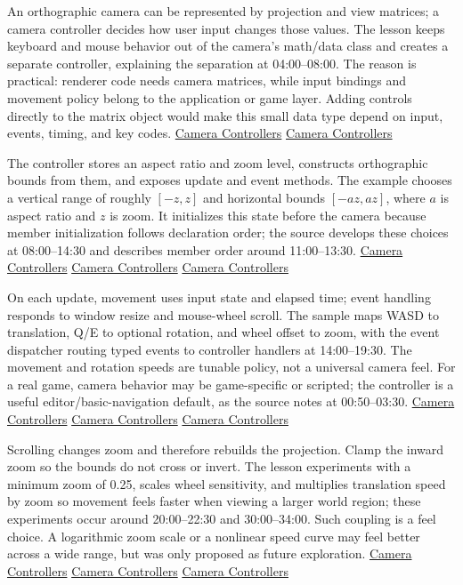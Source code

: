 \hypertarget{06-engine-ii-ch026-keep-camera-data-separate-from-camera-behavior}{}

An orthographic camera can be represented by projection and view matrices; a camera controller decides how user input changes those values. The lesson keeps keyboard and mouse behavior out of the camera's math/data class and creates a separate controller, explaining the separation at 04:00--08:00. The reason is practical: renderer code needs camera matrices, while input bindings and movement policy belong to the application or game layer. Adding controls directly to the matrix object would make this small data type depend on input, events, timing, and key codes. \href{https://www.youtube.com/watch?v=q7rwMoZQSmw&t=240s}{Camera Controllers} \href{https://www.youtube.com/watch?v=q7rwMoZQSmw&t=420s}{Camera Controllers}

The controller stores an aspect ratio and zoom level, constructs orthographic bounds from them, and exposes update and event methods. The example chooses a vertical range of roughly \([-z,z]\) and horizontal bounds \([-az,az]\), where \(a\) is aspect ratio and \(z\) is zoom. It initializes this state before the camera because member initialization follows declaration order; the source develops these choices at 08:00--14:30 and describes member order around 11:00--13:30. \href{https://www.youtube.com/watch?v=q7rwMoZQSmw&t=480s}{Camera Controllers} \href{https://www.youtube.com/watch?v=q7rwMoZQSmw&t=660s}{Camera Controllers} \href{https://www.youtube.com/watch?v=q7rwMoZQSmw&t=810s}{Camera Controllers}

On each update, movement uses input state and elapsed time; event handling responds to window resize and mouse-wheel scroll. The sample maps WASD to translation, Q/E to optional rotation, and wheel offset to zoom, with the event dispatcher routing typed events to controller handlers at 14:00--19:30. The movement and rotation speeds are tunable policy, not a universal camera feel. For a real game, camera behavior may be game-specific or scripted; the controller is a useful editor/basic-navigation default, as the source notes at 00:50--03:30. \href{https://www.youtube.com/watch?v=q7rwMoZQSmw&t=50s}{Camera Controllers} \href{https://www.youtube.com/watch?v=q7rwMoZQSmw&t=840s}{Camera Controllers} \href{https://www.youtube.com/watch?v=q7rwMoZQSmw&t=960s}{Camera Controllers}

Scrolling changes zoom and therefore rebuilds the projection. Clamp the inward zoom so the bounds do not cross or invert. The lesson experiments with a minimum zoom of 0.25, scales wheel sensitivity, and multiplies translation speed by zoom so movement feels faster when viewing a larger world region; these experiments occur around 20:00--22:30 and 30:00--34:00. Such coupling is a feel choice. A logarithmic zoom scale or a nonlinear speed curve may feel better across a wide range, but was only proposed as future exploration. \href{https://www.youtube.com/watch?v=q7rwMoZQSmw&t=1200s}{Camera Controllers} \href{https://www.youtube.com/watch?v=q7rwMoZQSmw&t=1800s}{Camera Controllers} \href{https://www.youtube.com/watch?v=q7rwMoZQSmw&t=1980s}{Camera Controllers}

